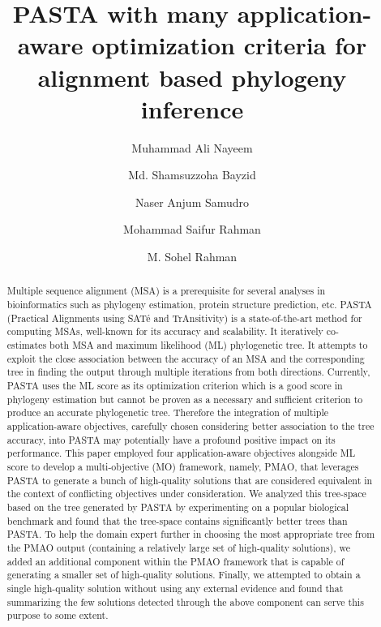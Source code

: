 \documentclass[a4paper,fleqn, review]{cas-dc}
\begin{document}
	

\title [mode = title]{PASTA with many application-aware optimization criteria for alignment based phylogeny inference}                      


\author[1]{Muhammad Ali Nayeem} 
\author[1]{Md. Shamsuzzoha Bayzid}
\author[1]{Naser Anjum Samudro}
\author[1]{Mohammad Saifur Rahman}
\author[1]{M. Sohel Rahman} \cormark[1]
\address[1]{Department of Computer Science \& Engineering, Bangladesh University of Engineering \& Technology, Dhaka 1205, Bangladesh}



\begin{abstract}
	Multiple sequence alignment (MSA) is a prerequisite for several analyses in bioinformatics such as phylogeny estimation, protein structure prediction, etc. PASTA (Practical Alignments using SAT\'e and TrAnsitivity) is a state-of-the-art method for computing MSAs, well-known for its accuracy and scalability. It iteratively co-estimates both MSA and maximum likelihood (ML) phylogenetic tree. It attempts to exploit the close association between the accuracy of an MSA and the corresponding tree in finding the output through multiple iterations from both directions. Currently, PASTA uses the ML score as its optimization criterion which is a good score in phylogeny estimation but cannot be proven as a necessary and sufficient criterion to produce an accurate phylogenetic tree. Therefore the integration of multiple application-aware objectives, carefully chosen considering better association to the tree accuracy, into PASTA may potentially have a profound positive impact on its performance. This paper employed four application-aware objectives alongside ML score to develop a multi-objective (MO) framework, namely, PMAO, that leverages PASTA to generate a bunch of high-quality solutions that are considered equivalent in the context of conflicting objectives under consideration. We analyzed this tree-space based on the tree generated by PASTA by experimenting on a popular biological benchmark and found that the tree-space contains significantly better trees than PASTA. 
	To help the domain expert further in choosing the most appropriate tree from the PMAO output (containing a relatively large set of high-quality solutions), we added an additional component within the PMAO framework that is capable of generating a smaller set of high-quality solutions. Finally, we attempted to obtain a single high-quality solution without using any external evidence and found that summarizing the few solutions detected through the above component can serve this purpose to some extent.
\end{abstract}
\end{document}
